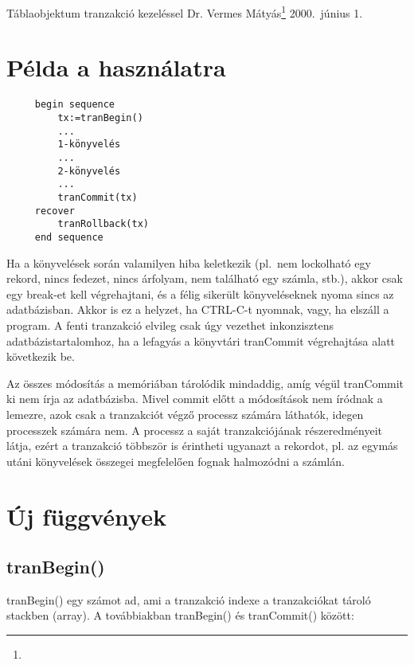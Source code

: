 
\pagetitle%
{Táblaobjektum tranzakció kezeléssel}%
{Dr. Vermes Mátyás\footnote{\ComFirm}}%
{2000.\ június 1.}


\section{Példa a használatra}
 
\begin{verbatim}
     begin sequence
         tx:=tranBegin()
         ...
         1-könyvelés
         ...
         2-könyvelés
         ...
         tranCommit(tx)
     recover
         tranRollback(tx)
     end sequence
\end{verbatim}
 
Ha a könyvelések során valamilyen hiba keletkezik (pl.\ nem lockolható
egy rekord, nincs fedezet, nincs árfolyam, nem található egy számla, stb.),
akkor csak egy break-et kell végrehajtani, és a félig sikerült 
könyveléseknek nyoma sincs az adatbázisban. Akkor is ez a helyzet,
ha CTRL-C-t nyomnak, vagy, ha elszáll a program. 
A fenti tranzakció elvileg csak úgy vezethet inkonzisztens 
adatbázistartalomhoz, ha a lefagyás a könyvtári tranCommit végrehajtása 
alatt következik be. 

Az összes módosítás a memóriában tárolódik mindaddig, amíg végül tranCommit
ki nem írja az adatbázisba.  Mivel commit előtt a módosítások nem íródnak a lemezre,
azok csak a tranzakciót végző processz számára láthatók, idegen processzek
számára nem. A processz a saját tranzakciójának részeredményeit látja,
ezért a tranzakció többször is érintheti ugyanazt a rekordot, pl.{}
az egymás utáni könyvelések összegei megfelelően fognak
halmozódni a számlán.


 
 
\section{Új függvények} 


\subsection{tranBegin()}

tranBegin() egy számot ad, ami a tranzakció indexe a tranzakciókat
tároló stackben (array). A továbbiakban tranBegin() és tranCommit() között:

